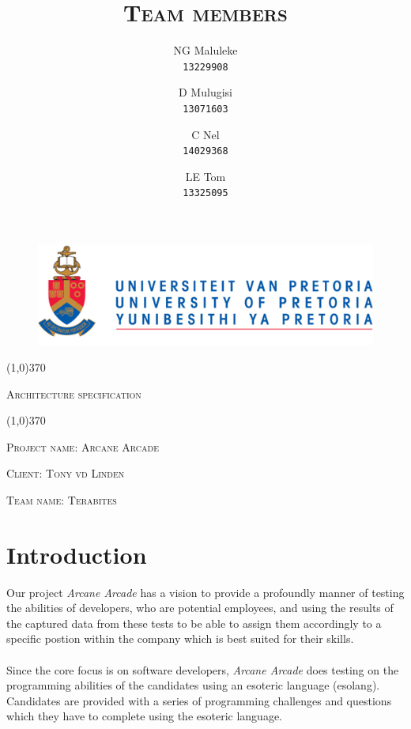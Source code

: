 \documentclass[english]{article}
\title{\scshape\Large Team members}
\author{
	NG Maluleke\\
	\texttt{13229908}
	\and
	D Mulugisi\\
	\texttt{13071603}
	\and
	C Nel\\
	\texttt{14029368}
	\and
	LE Tom\\
	\texttt{13325095}
}
\begin{document}
	
	\begin{figure}
	      \includegraphics[width=\linewidth]{up_logo.png}
	\end{figure}
	
	\begin{center}
	 \line(1,0){370}
	\\[0.2cm]
    {\scshape\Large Architecture specification \par}
	\vspace{0.1cm}
	\line(1,0){370}
	\\[0.8cm]
	
	{\scshape\large Project name: Arcane Arcade\par}	
	\vspace{1cm}
	{\scshape\large Client: Tony vd Linden\par}
	\vspace{1cm}
	{\scshape\large Team name: Terabites\par}
	\vspace{1cm}
	{\let\newpage\relax\maketitle}
	\end{center}
	
	
	\newpage
	\tableofcontents

	\newpage
	
	\section{Introduction}
		Our project \textit{Arcane Arcade} has a vision to provide a profoundly manner of testing the abilities of developers, who are potential employees, and using the results of the captured
		data from these tests to be able to assign them accordingly to a specific postion within the company which is best suited for their skills.\\\\
		Since the core focus is on software developers, \textit{Arcane Arcade} does testing on the programming abilities of the candidates using an esoteric language (esolang). Candidates are 
		provided with a series of programming challenges and questions which they have to complete using the esoteric language.
\end{document}
